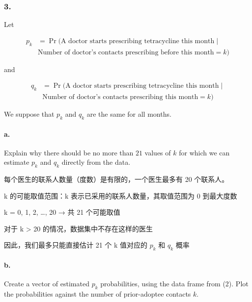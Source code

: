 \documentclass[
]{article}
\begin{document}
\subsubsection{3.}\label{section-2}

Let

    \begin{equation}
    \begin{split}
    p_k & = \Pr(\text{A doctor starts prescribing tetracycline this month} \mid \\
     & \text{Number of doctor's contacts prescribing before this month}=k) 
     \end{split}
     \end{equation}

and

    \begin{equation}
    \begin{split}
     q_k & = \Pr(\text{A doctor starts prescribing tetracycline this month} \mid \\ 
     & \text{Number of doctor's contacts prescribing this month}=k)
     \end{split}
     \end{equation}

We suppose that \(p_k\) and \(q_k\) are the same for all months.

\paragraph{a.}\label{a.}

Explain why there should be no more than \(21\) values of \(k\) for
which we can estimate \(p_k\) and \(q_k\) directly from the data.

每个医生的联系人数量（度数）是有限的，一个医生最多有 20 个联系人。

k 的可能取值范围：k 表示已采用的联系人数量，其取值范围为 0 到最大度数

k = 0, 1, 2, \ldots, 20 → 共 21 个可能取值

对于 k \textgreater{} 20 的情况，数据集中不存在这样的医生

因此，我们最多只能直接估计 21 个 k 值对应的 \(p_k\) 和 \(q_k\) 概率

\paragraph{b.}\label{b.}

Create a vector of estimated \(p_k\) probabilities, using the data frame
from (2). Plot the probabilities against the number of prior-adoptee
contacts \(k\).
\end{document}

